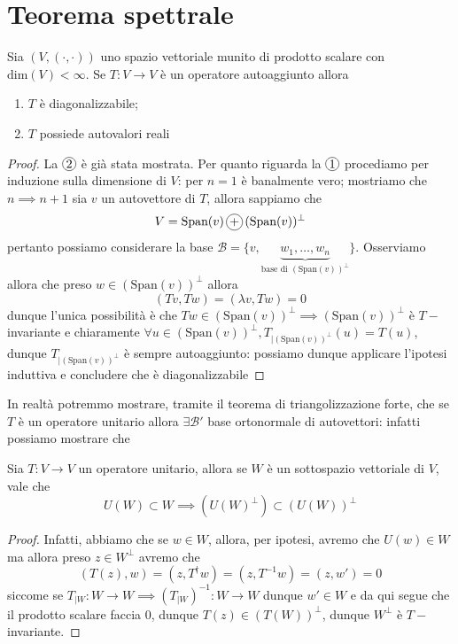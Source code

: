 \documentclass[12pt, twoside, italian, openany]{book}
\begin{document}
	\section{Teorema spettrale}
	\begin{theorem}
		Sia $(V, (\cdot, \cdot))$ uno spazio vettoriale munito di prodotto scalare con $\text{dim}(V) < \infty$. Se $T: V \to V$ è un operatore autoaggiunto allora
		\begin{enumerate}[label=\protect\circled{\arabic*}]
			\item $T$ è diagonalizzabile;
			\item $T$ possiede autovalori reali
		\end{enumerate}
	\end{theorem}
	\begin{proof}
		La $\circled{2}$ è già stata mostrata. Per quanto riguarda la $\circled{1}$ procediamo per induzione sulla dimensione di $V$: per $n=1$ è banalmente vero; mostriamo che $n \implies n+1$ sia $v$ un autovettore di $T$, allora sappiamo che
		$$
		V = \text{Span}(v) \, \circled{+} \, (\text{Span}(v))^\perp
		$$
		pertanto possiamo considerare la base $\mathcal{B} = \{ v, \underbrace{w_1, \ldots, w_n}_\text{base di $(\text{Span}(v))^\perp$} \}$. Osserviamo allora che
		preso $w \in (\text{Span}(v))^\perp$ allora
		$$
		(Tv, Tw) = (\lambda v, Tw) = 0
		$$
		dunque l'unica possibilità è che $Tw \in (\text{Span}(v))^\perp \implies (\text{Span}(v))^\perp$ è $T-$invariante e chiaramente $\forall u \in (\text{Span}(v))^\perp, T_{|(\text{Span}(v))^\perp}(u) = T(u)$, dunque $T_{|(\text{Span}(v))^\perp}$ è sempre autoaggiunto: possiamo dunque applicare l'ipotesi induttiva e concludere che è diagonalizzabile
	\end{proof}
	In realtà potremmo mostrare, tramite il teorema di triangolizzazione forte, che se $T$ è un operatore unitario allora $\exists \mathcal{B}'$ base ortonormale di autovettori: infatti possiamo mostrare che
	\begin{lemma}
		Sia $T: V \to V$ un operatore unitario, allora se $W$ è un sottospazio vettoriale di $V$, vale che
		$$
		U(W) \subset W \implies (U(W)^{\perp}) \subset (U(W))^\perp
		$$
	\end{lemma}
	\begin{proof}
		Infatti, abbiamo che se $w \in W$, allora, per ipotesi, avremo che
		$
		U(w) \in W
		$
		ma allora preso $z \in W^{\perp}$ avremo che
		$$
		(T(z), w) = (z, T^{\dag} w) = (z, T^{-1} w) = (z, w') = 0
		$$
		siccome se $T_{|W}: W \to W \implies (T_{|W})^{-1}: W \to W$ dunque $w' \in W$ e da qui segue che il prodotto scalare faccia $0$, dunque $T(z) \in (T(W))^{\perp}$, dunque $W^{\perp}$ è $T-$invariante.
	\end{proof}
\end{document}
